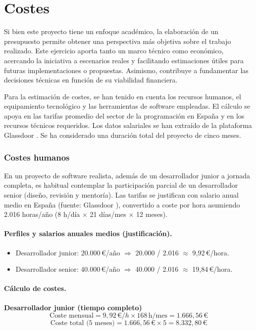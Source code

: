 \section{Costes}

Si bien este proyecto tiene un enfoque académico, la elaboración de un presupuesto permite obtener una perspectiva más objetiva sobre el trabajo realizado. Este ejercicio aporta tanto un marco técnico como económico, acercando la iniciativa a escenarios reales y facilitando estimaciones útiles para futuras implementaciones o propuestas. Asimismo, contribuye a fundamentar las decisiones técnicas en función de su viabilidad financiera.

Para la estimación de costes, se han tenido en cuenta los recursos humanos, el equipamiento tecnológico y las herramientas de software empleadas. El cálculo se apoya en las tarifas promedio del sector de la programación en España y en los recursos técnicos requeridos. Los datos salariales se han extraído de la plataforma Glassdoor \cite{glassdoor}. Se ha considerado una duración total del proyecto de cinco meses.

\subsubsection{Costes humanos}

En un proyecto de software realista, además de un desarrollador junior a jornada completa, es habitual contemplar la participación parcial de un desarrollador senior (diseño, revisión y mentoría). Las tarifas se justifican con salario anual medio en España (fuente: Glassdoor \cite{glassdoor}), convertido a coste por hora asumiendo 2.016 horas/año (8 h/día \(\times\) 21 días/mes \(\times\) 12 meses).

\paragraph{Perfiles y salarios anuales medios (justificación).}
\begin{itemize}
  \item Desarrollador junior: 20.000\,€/año $\Rightarrow$ 20.000 / 2.016 $\approx$ 9,92\,€/hora.
  \item Desarrollador senior: 40.000\,€/año $\Rightarrow$ 40.000 / 2.016 $\approx$ 19,84\,€/hora.
\end{itemize}

\paragraph{Cálculo de costes.}
\noindent\textbf{Desarrollador junior (tiempo completo)}\\
\[
\text{Coste mensual} = 9{,}92\,€/h \times 168\,\text{h/mes} = 1.666{,}56\,€
\]
\[
\text{Coste total (5 meses)} = 1.666{,}56\,€ \times 5 = 8.332{,}80\,€
\]


